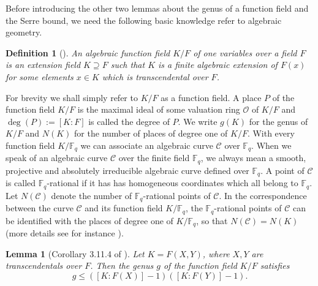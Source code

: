 \documentclass[preprint,10pt]{elsarticle}
\newcommand{\F}{\mathbb{F}}
\newcommand{\0}{\textbf{0}}
\newcommand{\1}{\textbf{1}}
\theoremstyle{plain}
\newtheorem{lemma}{Lemma}
\newtheorem{definition}{Definition}
\begin{document}
    Before introducing the other two lemmas about the genus of a function field and the Serre bound, we need the following basic knowledge refer to algebraic geometry. 

    \begin{definition}[\cite{Stichtenoth2008book_algebraicfunctionfieldsandcodes}]
        An algebraic function field $K/F$ of one variables over a field $F$ is an extension field $K\supseteq F$ such that $K$ is a finite algebraic extension of $F(x)$ for some elements $x\in K$ which is transcendental over $F$.
    \end{definition}
    For brevity we shall simply refer to $K/F$ as a function field.
    A place $P$ of the function field $K/F$ is the maximal ideal of some valuation ring $\mathcal{O}$ of $K/F$ and $\deg(P):=\left[K:F\right]$ is called the degree of $P$. 
    We write $g(K)$ for the genus of $K/F$ and $N(K)$ for the number of places of degree one of $K/F$.
    With every function field $K/\F_q$ we can associate an algebraic curve $\mathcal{C}$ over $\F_q$. 
    When we speak of an algebraic curve $\mathcal{C}$ over the finite field $\F_q$, we always mean a smooth, projective and absolutely irreducible algebraic curve defined over $\F_q$. 
    A point of $\mathcal{C}$ is called $\F_q$-rational if it has has homogeneous coordinates which all belong to $\F_q$.
    Let $N(\mathcal{C})$ denote the number of $\F_q$-rational points of $\mathcal{C}$. 
    In the correspondence between the curve $\mathcal{C}$ and its function field $K/\F_q$, 
    the $\F_q$-rational points of $\mathcal{C}$ can be identified with the places of degree one of $K/\F_q$, so that $N(\mathcal{C}) = N(K)$ (more details see for instance \cite{Serre1982serrebound}). 
    
    \begin{lemma}[Corollary 3.11.4 of \cite{Stichtenoth2008book_algebraicfunctionfieldsandcodes}]\label{L:genus_K_F}
        Let $K=F(X,Y)$, where $X,Y$ are transcendentals over $F$.
        Then the genus $g$ of the function field $K/F$ satisfies
        \[g\le ([K : F(X)] - 1)([K : F(Y)] - 1).\]
    \end{lemma}
\end{document}
